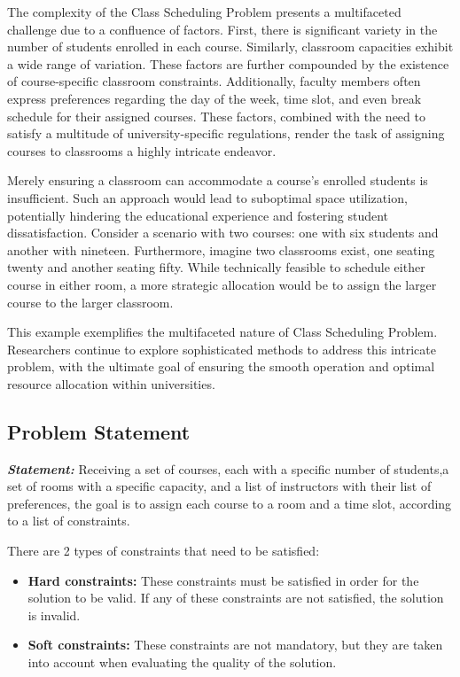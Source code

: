 \documentclass[runningheads]{paper}
\begin{document}
The complexity of the Class Scheduling Problem presents a multifaceted challenge due 
to a confluence of factors. First, there is significant variety in the 
number of students enrolled in each course.  Similarly, classroom capacities 
exhibit a wide range of variation. These factors are further compounded by the 
existence of course-specific classroom constraints. Additionally, faculty 
members often express preferences regarding the day of the week, time slot, 
and even break schedule for their assigned courses. These factors, combined 
with the need to satisfy a multitude of university-specific regulations, render 
the task of assigning courses to classrooms a highly intricate endeavor.

Merely ensuring a classroom can accommodate a course's enrolled students is 
insufficient. Such an approach would lead to suboptimal space utilization, 
potentially hindering the educational experience and fostering student 
dissatisfaction. Consider a scenario with two courses: one with six students 
and another with nineteen. Furthermore, imagine two classrooms exist, one 
seating twenty and another seating fifty. While technically feasible to 
schedule either course in either room, a more strategic allocation would be to 
assign the larger course to the larger classroom.

This example exemplifies the multifaceted nature of Class Scheduling Problem. 
Researchers continue to explore sophisticated methods to address this intricate 
problem, with the ultimate goal of ensuring the smooth operation and optimal 
resource allocation within universities.

\subsection{Problem Statement}
\textbf{\textit{Statement:}} Receiving a set of courses, each with a specific
number of students,a set of rooms with a specific capacity, and a list of 
instructors with their list of preferences, the goal is to assign each course to
a room and a time slot, according to a list of constraints.

There are 2 types of constraints that need to be satisfied:
\begin{itemize}
    \item \textbf{Hard constraints:} These constraints must be satisfied in order
    for the solution to be valid. If any of these constraints are not satisfied, 
    the solution is invalid.
    \item \textbf{Soft constraints:} These constraints are not mandatory, but 
    they are taken into account when evaluating the quality of the solution.
\end{itemize}
\end{document}
